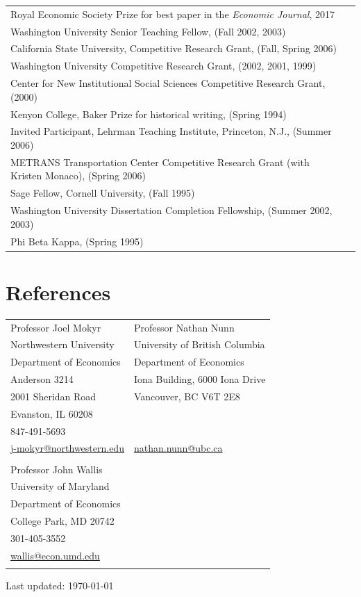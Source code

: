\documentclass[11pt,fullpage]{article}
\begin{document}
\begin{tabular}{ll}
	Royal Economic Society Prize for best paper in the \textit{Economic Journal}, 2017 \\
	Washington University Senior Teaching Fellow, (Fall 2002, 2003) \\
	California State University, Competitive Research Grant, (Fall, Spring 2006) \\
	Washington University Competitive Research Grant, (2002, 2001, 1999) \\
	Center for New Institutional Social Sciences Competitive Research Grant, (2000) \\
	Kenyon College, Baker Prize for historical writing, (Spring 1994) \\
	Invited Participant, Lehrman Teaching Institute, Princeton, N.J., (Summer 2006) \\
	METRANS Transportation Center Competitive Research Grant (with Kristen Monaco), (Spring 2006) \\
	Sage Fellow, Cornell University, (Fall 1995) \\
	Washington University Dissertation Completion Fellowship, (Summer 2002, 2003) \\
	Phi Beta Kappa, (Spring 1995)	\\
\end{tabular}	


\vspace{.25cm}


\section*{References}

\begin{tabular}{l@{\hskip 1in}l}
	Professor Joel Mokyr & Professor Nathan Nunn \\
	Northwestern University &  University of British Columbia\\
	Department of Economics & Department of Economics \\
	Anderson 3214 &  Iona Building, 6000 Iona Drive \\ 
	2001 Sheridan Road & Vancouver, BC V6T 2E8  \\
	Evanston, IL 60208 &   \\
	847-491-5693 &  \\
	\href{mailto:j-mokyr@northwestern.edu}{j-mokyr@northwestern.edu} & \href{mailto:nathan.nunn@ubc.ca}{nathan.nunn@ubc.ca}  \\
	\vspace{.5cm} \\
	Professor John Wallis\\
	University of Maryland\\
	Department of Economics\\
	College Park, MD 20742\\ 
	301-405-3552\\
	\href{mailto:wallis@econ.umd.edu}{wallis@econ.umd.edu} \\
	\vspace{.5cm} \\
	\end{tabular}
	
	
\bigskip
\begin{center}
  \begin{footnotesize}
    Last updated: \today
  \end{footnotesize}
\end{center}

\end{document}
